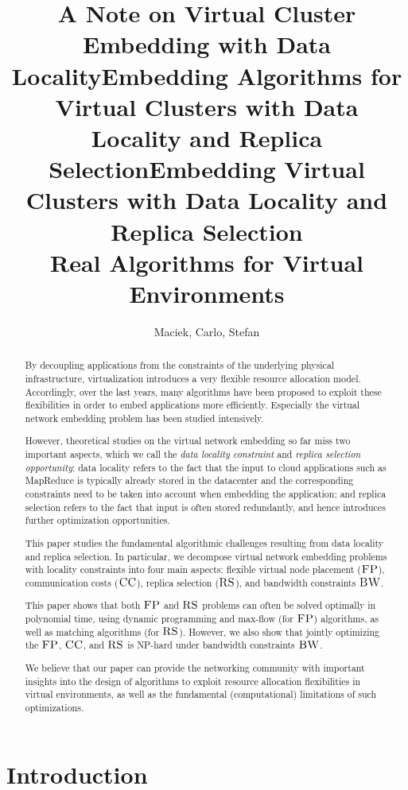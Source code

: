 \documentclass[9pt,twocolumn]{scrartcl}
\title{A Note on Virtual Cluster Embedding with Data Locality}
\title{Embedding Algorithms for Virtual Clusters with Data Locality and Replica Selection}
\title{Embedding Virtual Clusters with Data Locality and Replica Selection\\{\Large Real Algorithms for Virtual Environments}}
\author{Maciek, Carlo, Stefan}
\newcommand{\CC}{\textsc{CC}}
\newcommand{\FP}{\textsc{FP}}
\newcommand{\RS}{\textsc{RS}}
\newcommand{\BW}{\textsc{BW}}
\begin{document}
\maketitle


\begin{abstract}
By decoupling applications from the constraints of the underlying physical
infrastructure, virtualization introduces a very flexible resource allocation model.
Accordingly, over the last years, many algorithms have been proposed to exploit
these flexibilities in order to embed applications more efficiently. Especially the 
virtual network embedding problem has been studied intensively.

However, theoretical studies on the virtual network embedding so far miss two important aspects,
which we call the \emph{data locality constraint} and \emph{replica selection opportunity}: 
data locality refers to the fact that the input to cloud applications such as MapReduce
is typically already stored  in the datacenter and the corresponding constraints need to be taken into account when embedding
the application; and replica selection refers to the fact that input is often stored redundantly, and
hence introduces further optimization opportunities.

This paper studies the fundamental algorithmic challenges resulting from data locality
and replica selection. 
In particular, we decompose virtual network embedding problems with locality constraints
into four
main aspects: flexible virtual node placement ($\FP$), communication costs ($\CC$),
replica selection ($\RS$), 
and bandwidth constraints $\BW$.

This paper shows that both $\FP$ and $\RS$ problems can often be solved optimally in polynomial time,
using dynamic programming and max-flow (for $\FP$) algorithms, as well as matching algorithms (for $\RS$).
However, we also show that jointly optimizing the $\FP$, $\CC$,
and $\RS$ is NP-hard under bandwidth constraints $\BW$.

We believe that our paper can provide the networking community with important insights into the
design of algorithms to exploit resource allocation flexibilities in virtual environments, as well as the fundamental (computational)
limitations of such optimizations.
\end{abstract}

\section{Introduction}
\end{document}
